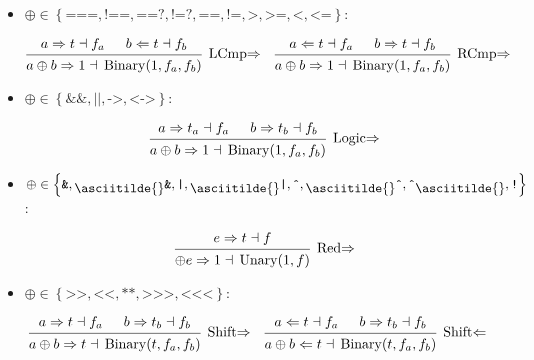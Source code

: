 \documentclass{article}
\DeclareMathOperator{\Binary}{Binary}
\DeclareMathOperator{\Unary}{Unary}
\newcommand{\mytilde}{\raisebox{-.7ex}{\asciitilde{}}}
\newcommand{\comp}{\ensuremath{\left\{
      \texttt{===}, \texttt{!==}, \texttt{==?}, \texttt{!=?}, \texttt{==},
      \texttt{!=}, \texttt{>}, \texttt{>=}, \texttt{<}, \texttt{<=}
    \right\}}}
\newcommand{\logic}{\ensuremath{\left\{\texttt{\&\&}, \texttt{||}, \texttt{->}, \texttt{<->}\right\}}}
\newcommand{\red}{\ensuremath{\left\{
      \texttt{\&}, \mytilde\texttt{\&}, \texttt{|}, \mytilde\texttt{|}, \texttt{\^{}},
      \mytilde\texttt{\^{}}, \texttt{\^{}}\mytilde, \texttt{!}
    \right\}}}
\newcommand{\shift}{\ensuremath{\left\{
      \texttt{>>}, \texttt{<}\texttt{<}, \texttt{**}, \texttt{>>>},
      \texttt{<}\texttt{<}\texttt{<}
    \right\}}}
\renewcommand{\S}{\ensuremath{\Rightarrow}}
\newcommand{\C}{\ensuremath{\Leftarrow}}
\newcommand{\s}[3]{#1 \S{} #2 \dashv{} #3}
\renewcommand{\c}[3]{#1 \C{} #2 \dashv{} #3}
\begin{document}
\begin{itemize}[leftmargin=*]
    \item $\oplus \in \comp$:

          \begin{align*}
               &
              \begin{prooftree}
                  \hypo{\s{a}{t}{f_a}}
                  \hypo{\c{b}{t}{f_b}}
                  \infer2[LCmp\S]{\s{a \oplus b}{1}{\Binary(1, f_a, f_b)}}
              \end{prooftree}
               &
               &
              \begin{prooftree}
                  \hypo{\c{a}{t}{f_a}}
                  \hypo{\s{b}{t}{f_b}}
                  \infer2[RCmp\S]{\s{a \oplus b}{1}{\Binary(1, f_a, f_b)}}
              \end{prooftree}
          \end{align*}

    \item $\oplus \in \logic$:

          \begin{equation*}
              \begin{prooftree}
                  \hypo{\s{a}{t_a}{f_a}}
                  \hypo{\s{b}{t_b}{f_b}}
                  \infer2[Logic\S]{\s{a \oplus b}{1}{\Binary(1, f_a, f_b)}}
              \end{prooftree}
          \end{equation*}

    \item $\oplus \in \red$:

          \begin{equation*}
              \begin{prooftree}
                  \hypo{\s{e}{t}{f}}
                  \infer1[Red\S]{\s{\oplus e}{1}{\Unary(1, f)}}
              \end{prooftree}
          \end{equation*}


    \item $\oplus \in \shift$:

          \begin{align*}
               &
              \begin{prooftree}
                  \hypo{\s{a}{t}{f_a}}
                  \hypo{\s{b}{t_b}{f_b}}
                  \infer2[Shift\S]{\s{a \oplus b}{t}{\Binary(t, f_a, f_b)}}
              \end{prooftree}
               &
               &
              \begin{prooftree}
                  \hypo{\c{a}{t}{f_a}}
                  \hypo{\s{b}{t_b}{f_b}}
                  \infer2[Shift\C]{\c{a \oplus b}{t}{\Binary(t, f_a, f_b)}}
              \end{prooftree}
          \end{align*}


\end{itemize}
\end{document}
